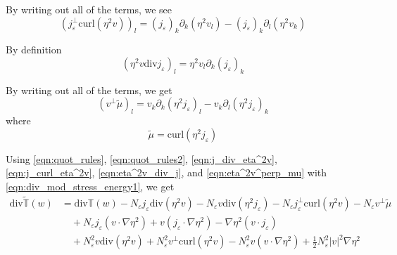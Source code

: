 \documentclass[a4paper]{article}
\newcommand{\curl}{\mathrm{curl}}
\renewcommand{\div}{\mathrm{div}}
\begin{document}
By writing out all of the terms, we see
\begin{equation}
  (j_\varepsilon^\perp \curl ( \eta^2 v ) )_l = (j_\varepsilon)_k \partial_k ( \eta^2 v_l ) - (j_\varepsilon)_k \partial_l ( \eta^2 v_k )
  \label{eqn:j_curl_eta^2v}
\end{equation}

By definition
\begin{equation}
  ( \eta^2 v \div j_\varepsilon )_l = \eta^2 v_l \partial_k (j_\varepsilon)_k
  \label{eqn:eta^2v_div_j}
\end{equation}

By writing out all of the terms, we get
\begin{equation}
  ( v^\perp \tilde{\mu} )_l = v_k \partial_k (\eta^2 j_\varepsilon)_l - v_k \partial_l (\eta^2 j_\varepsilon)_k
  \label{eqn:eta^2v^perp_mu}
\end{equation}
where
\begin{equation}
  \tilde{\mu} = \curl ( \eta^2 j_\varepsilon )
  \label{eqn:mu}
\end{equation}

Using \eqref{eqn:quot_rules}, \eqref{eqn:quot_rules2}, \eqref{eqn:j_div_eta^2v}, \eqref{eqn:j_curl_eta^2v}, \eqref{eqn:eta^2v_div_j}, and \eqref{eqn:eta^2v^perp_mu} with
\eqref{eqn:div_mod_stress_energy1}, we get
\begin{align}
  \div \tilde{\mathbb{T}}(w) &= \div \mathbb{T}(w) - N_\varepsilon j_\varepsilon \div(\eta^2 v) - N_\varepsilon v \div (\eta^2 j_\varepsilon) -
  N_\varepsilon j_\varepsilon^\perp \curl( \eta^2 v ) - N_\varepsilon v^\perp \tilde{\mu} \nonumber \\
  &\quad + N_\varepsilon j_\varepsilon ( v \cdot \nabla \eta^2 ) + v (j_\varepsilon \cdot \nabla \eta^2 ) - \nabla \eta^2 (v \cdot j_\varepsilon) \nonumber \\
  &\quad + N_\varepsilon^2 v \div (\eta^2 v) + N_\varepsilon^2 v^\perp \curl ( \eta^2 v ) - N_\varepsilon^2 v (v \cdot \nabla \eta^2) + \frac{1}{2}
  N_\varepsilon^2 |v|^2 \nabla
  \eta^2
  \label{eqn:div_mod_stress_energy}
\end{align}
\end{document}
